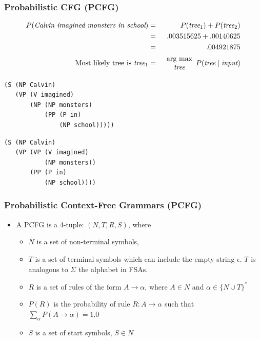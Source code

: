 \begin{frame}[fragile]
\frametitle{Probabilistic CFG (PCFG)}
\begin{eqnarray}
P(\textit{Calvin imagined monsters in school}) & = &
P(\textit{tree$_1$}) + P(\textit{tree$_2$}) \nonumber\\ 
& = & .003515625 + .00140625 \nonumber \\
& = & .004921875 \nonumber\\
\textrm{Most likely tree is \textit{tree$_1$}} & = & \begin{array}{c}\mbox{arg max}\\\textit{tree}\end{array} P(\textit{tree} \mid \textit{input}) \nonumber
\end{eqnarray}
\bigskip
\begin{minipage}{4in}
\begin{verbatim}
(S (NP Calvin)
   (VP (V imagined)
       (NP (NP monsters)
           (PP (P in)
               (NP school)))))
\end{verbatim}
\end{minipage}
\begin{minipage}{4in}
\begin{verbatim}
(S (NP Calvin)
   (VP (VP (V imagined)
           (NP monsters))
       (PP (P in)
           (NP school))))
\end{verbatim}
\end{minipage}

\end{frame}

\begin{frame}
\frametitle{Probabilistic Context-Free Grammars (PCFG)}
\begin{itemize}
\item A PCFG is a 4-tuple: $(N, T, R, S)$, where 
\begin{itemize}
\item $N$ is a set of non-terminal symbols, 
\item $T$ is a set of terminal symbols which can include the empty
  string $\epsilon$. $T$ is analogous to $\Sigma$ the alphabet in FSAs.
\item $R$ is a set of rules of the form $A \rightarrow \alpha$, where $A \in N$ and $\alpha \in \{ N \cup T \}^\ast$
\item $P(R)$ is the probability of rule $R: A \rightarrow \alpha$ such that $\sum_\alpha P(A \rightarrow \alpha) = 1.0$
\item $S$ is a set of start symbols, $S \in N$
\end{itemize}
\end{itemize}

\end{frame}

